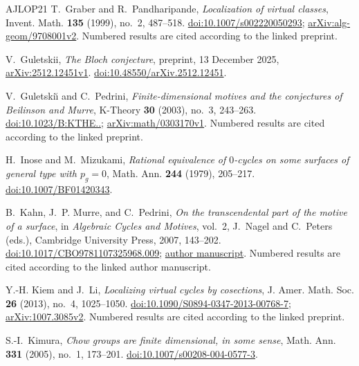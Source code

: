 \begin{thebibliography}{AJLOP21}
T.~Graber and R.~Pandharipande, \emph{Localization of virtual classes},
Invent. Math. \textbf{135} (1999), no.~2, 487--518.
\href{https://doi.org/10.1007/s002220050293}{doi:10.1007/s002220050293};
\href{https://arxiv.org/abs/alg-geom/9708001v2}{arXiv:alg-geom/9708001v2}.
Numbered results are cited according to the linked preprint.

V.~Guletskii, \emph{The Bloch conjecture}, preprint, 13 December 2025,
\href{https://arxiv.org/abs/2512.12451v1}{arXiv:2512.12451v1}.
\href{https://doi.org/10.48550/arXiv.2512.12451}{doi:10.48550/arXiv.2512.12451}.

V.~Guletski\u\i{} and C.~Pedrini,
\emph{Finite-dimensional motives and the conjectures of Beilinson and Murre},
K-Theory \textbf{30} (2003), no.~3, 243--263.
\href{https://doi.org/10.1023/B:KTHE.0000019787.69435.89}{doi:10.1023/\allowbreak B:KTHE..};
\href{https://arxiv.org/abs/math/0303170v1}{arXiv:math/0303170v1}.
Numbered results are cited according to the linked preprint.

H.~Inose and M.~Mizukami,
\emph{Rational equivalence of $0$-cycles on some surfaces of general type with $p_g=0$},
Math. Ann. \textbf{244} (1979), 205--217.
\href{https://doi.org/10.1007/BF01420343}{doi:10.1007/BF01420343}.

B.~Kahn, J.~P. Murre, and C.~Pedrini,
\emph{On the transcendental part of the motive of a surface},
in \emph{Algebraic Cycles and Motives}, vol.~2,
J.~Nagel and C.~Peters (eds.), Cambridge University Press, 2007,
143--202.
\href{https://doi.org/10.1017/CBO9781107325968.009}{doi:10.1017/CBO9781107325968.009};
\href{https://webusers.imj-prg.fr/~bruno.kahn/preprints/surfaces4.pdf}{author manuscript}.
Numbered results are cited according to the linked author manuscript.

Y.-H. Kiem and J.~Li, \emph{Localizing virtual cycles by cosections},
J. Amer. Math. Soc. \textbf{26} (2013), no.~4, 1025--1050.
\href{https://doi.org/10.1090/S0894-0347-2013-00768-7}{doi:10.1090/S0894-0347-2013-00768-7};
\href{https://arxiv.org/abs/1007.3085v2}{arXiv:1007.3085v2}.
Numbered results are cited according to the linked preprint.

S.-I.~Kimura,
\emph{Chow groups are finite dimensional, in some sense},
Math. Ann. \textbf{331} (2005), no.~1, 173--201.
\href{https://doi.org/10.1007/s00208-004-0577-3}{doi:10.1007/s00208-004-0577-3}.


\end{thebibliography}
